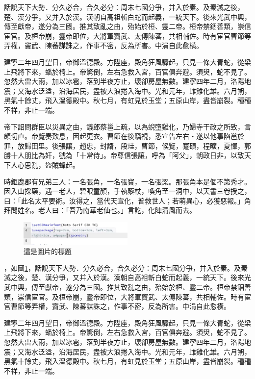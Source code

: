 \documentclass[12pt]{article}
\begin{document}
話說天下大勢．分久必合，合久必分：周末七國分爭，并入於秦。及秦滅之後，楚、漢分爭，又并入於漢。漢朝自高祖斬白蛇而起義，一統天下。後來光武中興，傳至獻帝，遂分為三國。推其致亂之由，殆始於桓、靈二帝。桓帝禁錮善類，崇信宦官。及桓帝崩，靈帝即位，大將軍竇武、太傅陳蕃，共相輔佐。時有宦官曹節等弄權，竇武、陳蕃謀誅之，作事不密，反為所害。中涓自此愈橫。

建寧二年四月望日，帝御溫德殿。方陞座，殿角狂風驟起，只見一條大青蛇，從梁上飛將下來，蟠於椅上。帝驚倒，左右急救入宮，百官俱奔避。須臾，蛇不見了。忽然大雷大雨，加以冰雹，落到半夜方止，壞卻房屋無數。建寧四年二月，洛陽地震；又海水泛溢，沿海居民，盡被大浪捲入海中。光和元年，雌雞化雄。六月朔，黑氣十餘丈，飛入溫德殿中。秋七月，有虹見於玉堂；五原山岸，盡皆崩裂。種種不祥，非止一端。

帝下詔問群臣以災異之由，議郎蔡邕上疏，以為蜺墮雞化，乃婦寺干政之所致，言頗切直。帝覽奏歎息，因起更衣。曹節在後竊視，悉宣告左右‧遂以他事陷邕於罪，放歸田里。後張讓，趙忠，封諝，段珪，曹節，候覽，蹇碩，程曠，夏惲，郭勝十人朋比為奸，號為「十常侍」。帝尊信張讓，呼為「阿父」，朝政日非，以致天下人心思亂，盜賊蜂起。

時鉅鹿郡有兄弟三人：一名張角，一名張寶，一名張梁。那張角本是個不第秀才。因入山採藥，遇一老人，碧眼童顏，手執藜杖，喚角至一洞中，以天書三卷授之，曰：「此名太平要術。汝得之，當代天宣化，普救世人；若萌異心，必獲惡報。」角拜問姓名。老人曰：「吾乃南華老仙也。」言訖，化陣清風而去。

\begin{figure}[h]
    \centering
    \includegraphics[width=0.5\textwidth]{截圖 2025-01-24 03.21.17.png}  %
    \caption{這是圖片的標題}
    \label{fig:example1}  %
\end{figure}
，如圖\ref{fig:example1}，話說天下大勢．分久必合，合久必分：周末七國分爭，并入於秦。及秦滅之後，楚、漢分爭，又并入於漢。漢朝自高祖斬白蛇而起義，一統天下。後來光武中興，傳至獻帝，遂分為三國。推其致亂之由，殆始於桓、靈二帝。桓帝禁錮善類，崇信宦官。及桓帝崩，靈帝即位，大將軍竇武、太傅陳蕃，共相輔佐。時有宦官曹節等弄權，竇武、陳蕃謀誅之，作事不密，反為所害。中涓自此愈橫。

建寧二年四月望日，帝御溫德殿。方陞座，殿角狂風驟起，只見一條大青蛇，從梁上飛將下來，蟠於椅上。帝驚倒，左右急救入宮，百官俱奔避。須臾，蛇不見了。忽然大雷大雨，加以冰雹，落到半夜方止，壞卻房屋無數。建寧四年二月，洛陽地震；又海水泛溢，沿海居民，盡被大浪捲入海中。光和元年，雌雞化雄。六月朔，黑氣十餘丈，飛入溫德殿中。秋七月，有虹見於玉堂；五原山岸，盡皆崩裂。種種不祥，非止一端。
\end{document}
